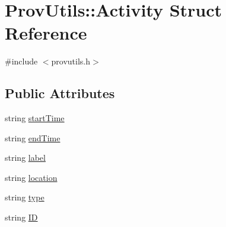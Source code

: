 \hypertarget{struct_prov_utils_1_1_activity}{\section{Prov\-Utils\-:\-:Activity Struct Reference}
\label{struct_prov_utils_1_1_activity}
}


{\ttfamily \#include $<$provutils.\-h$>$}

\subsection*{Public Attributes}
\begin{DoxyCompactItemize}
\item 
string \hyperlink{struct_prov_utils_1_1_activity_a559304d758e8a9f3b89365d7fd441522}{start\-Time}
\item 
string \hyperlink{struct_prov_utils_1_1_activity_ab36fceb1a61c132c1251ed7f3843c9ed}{end\-Time}
\item 
string \hyperlink{struct_prov_utils_1_1_activity_afb1b7e2ef615e4fcf11aa74e2340ab7f}{label}
\item 
string \hyperlink{struct_prov_utils_1_1_activity_a87753df0d0a14b8af93b0210fde66261}{location}
\item 
string \hyperlink{struct_prov_utils_1_1_activity_a210efd6ae1c8bf6ef64265374d745b93}{type}
\item 
string \hyperlink{struct_prov_utils_1_1_activity_a0e43209e61d327059162c0d1951aef6c}{I\-D}
\end{DoxyCompactItemize}


